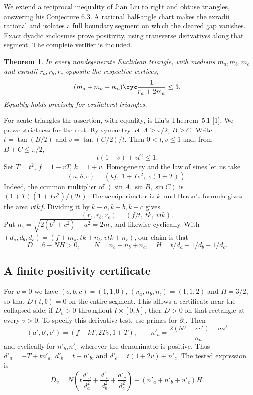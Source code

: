 \documentclass[11pt,a4paper]{article}
\numberwithin{equation}{section}
\newtheorem{theorem}{Theorem}[section]
\theoremstyle{definition}
\theoremstyle{remark}
\newenvironment{sectionabstract}{\par\smallskip\begingroup\small\noindent}{\par\endgroup\medskip}
\begin{document}
\begin{sectionabstract}
We extend a reciprocal inequality of Jian Liu to right and obtuse triangles, answering his Conjecture 6.3. A rational half-angle chart makes the exradii rational and isolates a full boundary segment on which the cleared gap vanishes. Exact dyadic enclosures prove positivity, using transverse derivatives along that segment. The complete verifier is included.
\end{sectionabstract}
\begin{theorem}
In every nondegenerate Euclidean triangle, with medians $m_a,m_b,m_c$ and exradii $r_a,r_b,r_c$ opposite the respective vertices,
\[
   (m_a+m_b+m_c)\cyc\frac{1}{r_a+2m_a}\leq 3.
\]
Equality holds precisely for equilateral triangles.
\end{theorem}
For acute triangles the assertion, with equality, is Liu's Theorem~5.1 [1]. We prove strictness for the rest. By symmetry let $A\geq\pi/2$, $B\geq C$. Write $t=\tan(B/2)$ and $v=\tan(C/2)/t$. Then $0<t,v\leq1$ and, from $B+C\leq\pi/2$,
\[
 t(1+v)+vt^2\leq1 .
\]
Set $T=t^2$, $f=1-vT$, $k=1+v$. Homogeneity and the law of sines let us take
\[
 (a,b,c)=(kf,\ 1+Tv^2,\ v(1+T)).
\]
Indeed, the common multiplier of $(\sin A,\sin B,\sin C)$ is $(1+T)(1+Tv^2)/(2t)$. The semiperimeter is $k$, and Heron's formula gives the area $vtkf$. Dividing it by $k-a,k-b,k-c$ gives
\[
 (r_a,r_b,r_c)=(f/t,\ tk,\ vtk).
\]
Put $n_a=\sqrt{2(b^2+c^2)-a^2}=2m_a$ and likewise cyclically. With $(d_a,d_b,d_c)=(f+tn_a,tk+n_b,vtk+n_c)$, our claim is that
\[
 D=6-NH>0,\qquad N=n_a+n_b+n_c,\quad H=t/d_a+1/d_b+1/d_c.
\]

\subsection*{A finite positivity certificate}
For $v=0$ we have $(a,b,c)=(1,1,0)$, $(n_a,n_b,n_c)=(1,1,2)$ and $H=3/2$, so that $D(t,0)=0$ on the entire segment. This allows a certificate near the collapsed side: if $D_v>0$ throughout $I\times[0,h]$, then $D>0$ on that rectangle at every $v>0$. To specify this derivative test, use primes for $\partial_v$. Then
\[
 (a',b',c')=(f-kT,2Tv,1+T),\qquad
 n'_a=\frac{2(bb'+cc')-aa'}{n_a}
\]
and cyclically for $n'_b,n'_c$ wherever the denominator is positive. Thus $d'_a=-T+tn'_a$, $d'_b=t+n'_b$, and $d'_c=t(1+2v)+n'_c$. The tested expression is
\[
 D_v=N\left(t\frac{d'_a}{d_a^2}+\frac{d'_b}{d_b^2}+\frac{d'_c}{d_c^2}\right)
       -(n'_a+n'_b+n'_c)H.
\]
\end{document}
